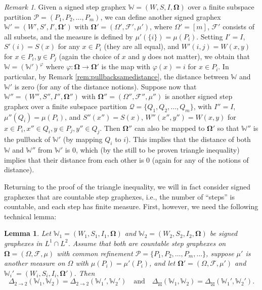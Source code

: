 \documentclass{amsart}
\numberwithin{equation}{section}
\numberwithin{figure}{section}
\newtheorem{lemma}[theorem]{Lemma}
\theoremstyle{definition}
\theoremstyle{remark}
\newtheorem{remark}[theorem]{Remark}
\newcommand{\jbl}{{\boxtimes}}
\newcommand{\bOmega}{{\mathbf{\Omega}}}
\newcommand{\cP}{\mathcal{P}}
\newcommand{\cQ}{\mathcal{Q}}
\newcommand{\cW}{\mathbb{W}}
\newcommand{\cF}{\mathcal{F}}
\begin{document}
\begin{remark} \label{rem:stepgraphexesequiv}
Given a signed step graphex $\cW=(W,S,I,\bOmega)$ over a finite subspace
partition $\cP=(P_1,P_2,\dots,P_m)$, we can define another signed graphex
$\cW'=(W',S',I',\bOmega')$ with $\bOmega'=(\Omega',\cF',\mu')$, where
$\Omega'=[m]$, $\cF'$ consists of all subsets, and the measure is defined by
$\mu'(\{i\})=\mu(P_i)$. Setting $I'=I$, $S'(i)=S(x)$ for any $x \in P_i$
(they are all equal), and $W'(i,j)=W(x,y)$ for $x \in P_i,y \in P_j$ (again
the choice of $x$ and $y$ does not matter), we obtain that
$\cW=(\cW')^\varphi$ where $\varphi\colon\bOmega \rightarrow \bOmega'$ is the
map with $\varphi(x)=i$ for $x \in P_i$. In particular, by Remark
\ref{rem:pullbacksamedistance}, the distance between $\cW$ and $\cW'$ is zero
(for any of the distance notions). Suppose now that
$\cW''=(W'',S'',I'',\bOmega'')$ with $\bOmega''=(\Omega'',\cF'',\mu'')$ is
another signed step graphex over a finite subspace partition
$\cQ=\{Q_1,Q_2,\dots,Q_m\}$, with $I''=I$, $\mu''(Q_i)=\mu(P_i)$, and
$S''(x'')=S(x)$, $W''(x'',y'')=W(x,y)$ for $x \in P_i,x'' \in Q_i,y \in
P_j,y'' \in Q_j$. Then $\bOmega''$ can also be mapped to $\bOmega'$ so that
$\cW''$ is the pullback of $\cW'$ (by mapping $Q_i$ to $i$). This implies
that the distance of both $\cW$ and $\cW''$ from $\cW'$ is $0$, which (by the
still to be proven triangle inequality) implies that their distance from each
other is $0$ (again for any of the notions of distance).
\end{remark}

Returning to the proof of the triangle inequality, we will in fact consider
signed graphexes that are countable step graphexes, i.e., the number of
``steps'' is countable, and each step has finite measure. First, however, we
need the following technical lemma:

\begin{lemma}
Let $\cW_1=(W_1,S_1,I_1,\bOmega)$ and $\cW_2=(W_2,S_2,I_2,\bOmega)$ be signed
graphexes in $L^1\cap L^2$. Assume that both are countable step graphexes on
$\bOmega=(\Omega,\cF,\mu)$ with common refinement
$\cP=\{P_1,P_2,\dots,P_m,\dots\}$, suppose $\mu'$ is another measure on
$\Omega$ with $\mu(P_i)=\mu'(P_i)$, and let $\bOmega'=(\Omega,\cF,\mu')$ and
$\cW_i'=(W_i,S_i,I_i,\bOmega')$. Then
\[
\Delta_{2\to 2}(\cW_1,\cW_2)=\Delta_{2\to 2}(\cW_1',\cW_2')
\quad\text{and}\quad
\Delta_{\jbl}(\cW_1,\cW_2)=\Delta_{\jbl}(\cW_1',\cW_2')
.
\]
\end{lemma}
\end{document}
